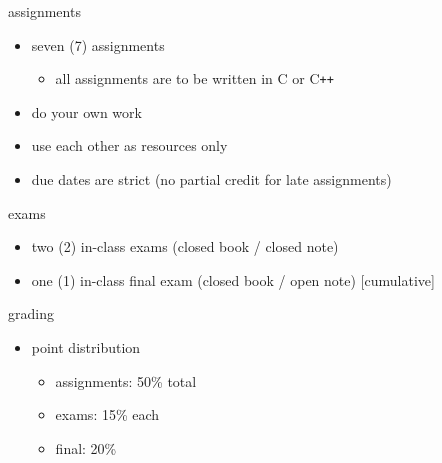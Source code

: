 \documentclass[10pt, t]{beamer}
\begin{document}
  \begin{frame}[fragile]{assignments}
    \begin{itemize}
      \item seven (7) assignments
        \begin{itemize}
          \item all assignments are to be written in C or C\verb|++|
        \end{itemize}
      \item do your own work
      \item use each other as resources only
      \item due dates are strict (no partial credit for late assignments)
    \end{itemize}

  \end{frame}

  \begin{frame}{exams}
    \begin{itemize}
      \item two (2) in-class exams (closed book / closed note)
      \item one (1) in-class final exam (closed book / open note) [cumulative]
    \end{itemize}

  \end{frame}

  \begin{frame}{grading}
    \begin{itemize}
      \item point distribution
        \begin{itemize}
          \item assignments: 50\% total
          \item exams: 15\% each
          \item final: 20\%
        \end{itemize}
    \end{itemize}
  \end{frame}
\end{document}
